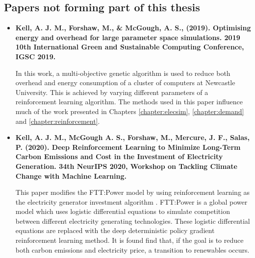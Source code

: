 \subsection*{Papers not forming part of this thesis}

\begin{itemize}
	\item[\textbf{\cite{Kell2019}}] \textbf{Kell, A. J. M., Forshaw, M., \& McGough, A. S., (2019). Optimising energy and overhead for large parameter space simulations. 2019 10th International Green and Sustainable Computing Conference, IGSC 2019. }
	
	In this work, a multi-objective genetic algorithm is used to reduce both overhead and energy consumption of a cluster of computers at Newcastle University. This is achieved by varying different parameters of a reinforcement learning algorithm. The methods used in this paper influence much of the work presented in Chapters \ref{chapter:elecsim}, \ref{chapter:demand} and \ref{chapter:reinforcement}.
	
	\item[\textbf{\cite{KellA.J.M.McGoughA.S.ForshawM.MercureJ.F.Salas2020}}] \textbf{Kell, A. J. M., McGough A. S., Forshaw, M., Mercure, J. F., Salas, P. (2020). Deep Reinforcement Learning to Minimize Long-Term Carbon Emissions and Cost in the Investment of Electricity Generation. 34th NeurIPS 2020, Workshop on Tackling Climate Change with Machine Learning.}
	
	This paper modifies the FTT:Power model by using reinforcement learning as the electricity generator investment algorithm \cite{Mercure2012}. FTT:Power is a global power model which uses logistic differential equations to simulate competition between different electricity generating technologies. These logistic differential equations are replaced with the deep deterministic policy gradient reinforcement learning method. It is found find that, if the goal is to reduce both carbon emissions and electricity price, a transition to renewables occurs.
\end{itemize}
